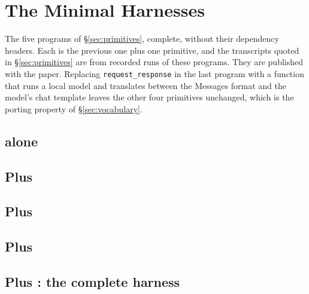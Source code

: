 \section{The Minimal Harnesses}
\label{app:minimal}

The five programs of \S\ref{sec:primitives}, complete, without their dependency headers. Each is the previous one plus one primitive, and the transcripts quoted in \S\ref{sec:primitives} are from recorded runs of these programs. They are published with the paper. Replacing \texttt{request\_response} in the last program with a function that runs a local model and translates between the Messages format and the model's chat template leaves the other four primitives unchanged, which is the porting property of \S\ref{sec:vocabulary}.


\subsection{ alone}

\subsection{Plus }

\subsection{Plus }

\subsection{Plus }

\subsection{Plus : the complete harness}

